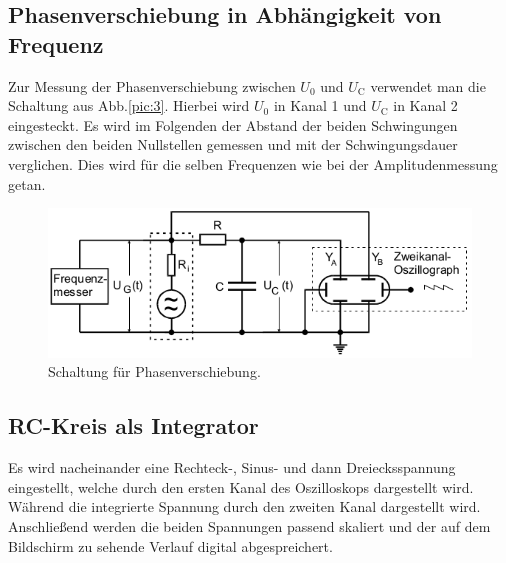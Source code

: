 \subsection{Phasenverschiebung in Abhängigkeit von Frequenz}
Zur Messung der Phasenverschiebung zwischen $U_0$ und $U_\text{C}$ verwendet man die Schaltung aus Abb.\ref{pic:3}.
Hierbei wird $U_0$ in Kanal 1 und $U_\text{C}$ in Kanal 2 eingesteckt.
Es wird im Folgenden der Abstand der beiden Schwingungen zwischen den beiden Nullstellen gemessen
und mit der Schwingungsdauer verglichen. Dies wird für die selben Frequenzen wie bei der Amplitudenmessung getan.

\begin{figure}[H]
  \centering
  \includegraphics{content/images/pic4.png}
  \caption{Schaltung für Phasenverschiebung.}
  \label{pic:4}
\end{figure}


\subsection{RC-Kreis als Integrator}
Es wird nacheinander eine Rechteck-, Sinus- und dann Dreiecksspannung eingestellt, welche durch den
ersten Kanal des Oszilloskops dargestellt wird. Während die integrierte Spannung durch den zweiten Kanal dargestellt wird.
Anschließend werden die beiden Spannungen passend skaliert und der auf dem Bildschirm zu sehende Verlauf
digital abgespreichert.

